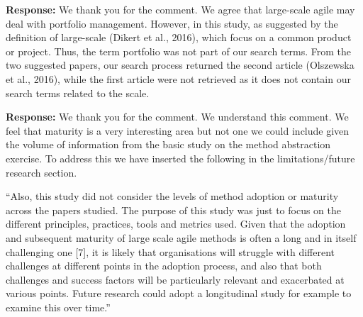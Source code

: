 \documentclass[a4paper,twoside,11pt]{reviewresponse}
\begin{document}
\textbf{Response:}
We thank you for the comment. We agree that large-scale agile may deal with portfolio management. However, in this study, as suggested by the definition of large-scale (Dikert et al., 2016), which focus on a common product or project. Thus, the term portfolio was not part of our search terms. From the two suggested papers, our search process returned the second article (Olszewska et al., 2016), while the first article were not retrieved as it does not contain our search terms related to the scale.


\textbf{Response:}
We thank you for the comment. We understand this comment. We feel that maturity is a very interesting area but not one we could include given the volume of information from the basic study on the method abstraction exercise. To address this we have inserted the following in the limitations/future research section.
 
``Also, this study did not consider the levels of method adoption or maturity across the papers studied. The purpose of this study was just to focus on the different principles, practices, tools and metrics used. Given that the adoption and subsequent maturity of large scale agile methods is often a long and in itself challenging one [7], it is likely that organisations will struggle with different challenges at different points in the adoption process, and also that both challenges and success factors will be particularly relevant and exacerbated at various points. Future research could adopt a longitudinal study for example to examine this over time.''
 
\end{document}
